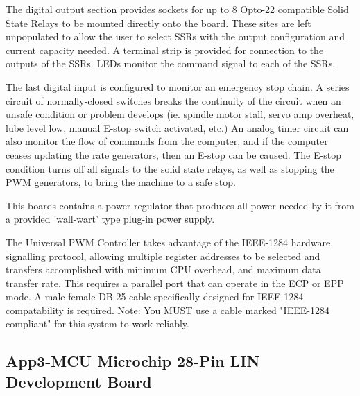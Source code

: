 The digital output section provides sockets for up to 8 Opto-22 compatible Solid State Relays to be mounted directly onto the board. These sites are left unpopulated to allow the user to select SSRs with the output configuration and current capacity needed. A terminal strip is provided for connection to the outputs of the SSRs. LEDs monitor the command signal to each of the SSRs.
\vspace{0.5cm}

The last digital input is configured to monitor an emergency stop chain. A series circuit of normally-closed switches breaks the continuity of the circuit when an unsafe condition or problem develops (ie. spindle motor stall, servo amp overheat, lube level low, manual E-stop switch activated, etc.) An analog timer circuit can also monitor the flow of commands from the computer, and if the computer ceases updating the rate generators, then an E-stop can be caused. The E-stop condition turns off all signals to the solid state relays, as well as stopping the PWM generators, to bring the machine to a safe stop.
\vspace{0.5cm}

This boards contains a power regulator that produces all power needed by it from a provided 'wall-wart' type plug-in power supply.
\vspace{0.5cm}

The Universal PWM Controller takes advantage of the IEEE-1284 hardware signalling protocol, allowing multiple register addresses to be selected and transfers accomplished with minimum CPU overhead, and maximum data transfer rate. This requires a parallel port that can operate in the ECP or EPP mode. A male-female DB-25 cable specifically designed for IEEE-1284 compatability is required. Note: You MUST use a cable marked "IEEE-1284 compliant" for this system to work reliably.

\pagebreak
\subsection{App3-MCU Microchip 28-Pin LIN Development Board}\label{sec:C-3.3-MCU Microchip 28-Pin LIN Development Board}
				
